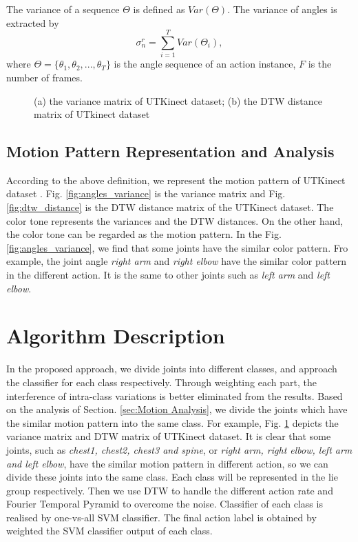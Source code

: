 \documentclass[conference]{IEEEtran}
\begin{document}
		The variance of a sequence $ \Theta $ is defined as $ Var(\Theta) $. The variance of angles is extracted by
		\begin{equation}
			{\sigma}_{n}^{r}=\sum_{i=1}^{T}Var(\Theta_{i}),
		\end{equation}
		where $ \Theta=\{\theta_{1},\theta_{2},...,\theta_{T}\} $ is the angle sequence of an action instance, $ F $ is the number of frames.
		\begin{figure}[h]
			\centering
			\vfill
			\centering
			\caption{(a) the variance matrix of UTKinect dataset; (b) the DTW distance matrix of UTkinect dataset}
			\label{fig:motion_pattern_matrix}
		\end{figure}
	\subsection{Motion Pattern Representation and Analysis}
		According to the above definition,
		we represent the motion pattern of UTKinect dataset \cite{hostogram_of_3d_joints}.
		Fig. \ref{fig:angles_variance} is the variance matrix and Fig. \ref{fig:dtw_distance} is the DTW distance matrix of the UTKinect dataset.
		The color tone represents the variances and the DTW distances.
		On the other hand, the color tone can be regarded as the motion pattern.
		In the Fig. \ref{fig:angles_variance}, we find that some joints have the similar color pattern.
		Fro example, the joint angle \textit{right arm} and \textit{right elbow} have the similar color pattern in the different action.
		It is the same to other joints such as \textit{left arm} and \textit{left elbow}.
		
\section{Algorithm Description}
\label{sec:Algorithm Description}
		In the proposed approach, we divide joints into different classes, and approach the classifier for each class respectively.
		Through weighting each part, the interference of intra-class variations is better eliminated from the results.
		Based on the analysis of Section. \ref{sec:Motion Analysis}, we divide the joints which have the similar motion pattern into the same class.
		For example, Fig. \ref{fig:motion_pattern_matrix} depicts the variance matrix and DTW matrix of UTKinect dataset.
		It is clear that some joints, such as \textit{chest1, chest2, chest3 and spine}, or \textit{right arm, right elbow, left arm and left elbow}, have the similar motion pattern in different action, so we can divide these joints into the same class.
		Each class will be represented in the lie group respectively.
		Then we use DTW to handle the different action rate and Fourier Temporal Pyramid to overcome the noise.
		Classifier of each class is realised by one-vs-all SVM classifier.
		The final action label is obtained by weighted the SVM classifier output of each class.
\end{document}
